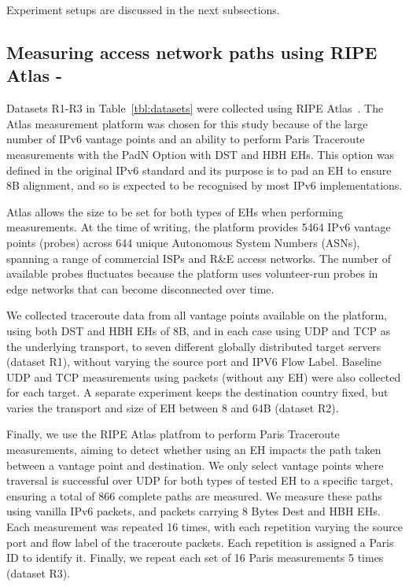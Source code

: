\documentclass[conference]{IEEEtran}
\begin{document}
Experiment setups are discussed in the next subsections.

    \subsection{Measuring access network paths using RIPE Atlas - }
    \label{sec:ripe-methodology}

Datasets R1-R3 in Table~\ref{tbl:datasets} were collected using RIPE Atlas~\cite{bajpai2015lessons}.
The Atlas measurement platform was chosen for this study because of the large number of IPv6 vantage points and an ability to perform Paris Traceroute measurements with the PadN Option with DST and HBH EHs. This option was defined in the original IPv6 standard and its purpose is to pad an EH to ensure 8B alignment, and so is expected to be recognised by most IPv6 implementations.

Atlas allows the size to be set for both types of EHs when performing measurements. At the time of writing, the platform provides 5464 IPv6 vantage points (probes) across 644 unique Autonomous System Numbers (ASNs), spanning a range of commercial ISPs and R\&E access networks. The number of available probes fluctuates because the platform uses volunteer-run probes in edge networks that can become disconnected over time.

We collected traceroute data from all vantage points available on the platform, using both DST and HBH EHs of 8B, and in each case using UDP and TCP as the underlying transport, to seven different globally distributed target servers (dataset R1), without varying the source port and IPV6 Flow Label. Baseline UDP and TCP measurements using packets (without any EH) were also collected for each target.
A separate experiment keeps the destination country fixed, but varies the transport and size of EH between 8 and 64B (dataset R2).

Finally, we use the RIPE Atlas platfrom to perform Paris Traceroute~\cite{augustin2006avoiding} measurements, aiming to detect whether using an EH impacts the path taken between a vantage point and destination. We only select vantage points where traversal is successful over UDP for both types of tested EH to a specific target, ensuring a total of 866 complete paths are measured.
We measure these paths using vanilla IPv6 packets, and packets carrying 8 Bytes Dest and HBH EHs. Each measurement was repeated 16 times, with each repetition varying the source port and flow label of the traceroute packets. Each repetition is assigned a Paris ID to identify it. Finally, we repeat each set of 16 Paris measurements 5 times (dataset R3).
\end{document}
